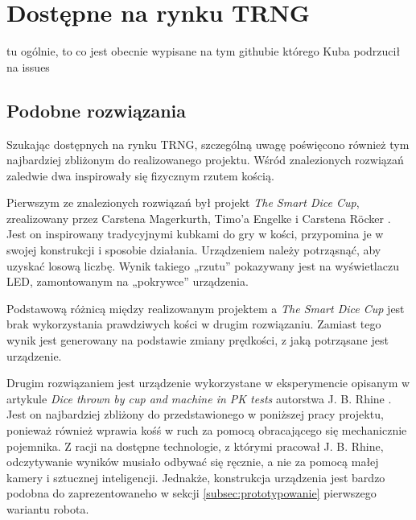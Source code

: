 \section{Dostępne na rynku TRNG}\label{sec:dostepne-na-rynku-trng}

tu ogólnie, to co jest obecnie wypisane na tym githubie którego Kuba podrzucił na issues

\subsection{Podobne rozwiązania}

Szukając dostępnych na rynku TRNG, szczególną uwagę poświęcono również tym najbardziej zbliżonym do realizowanego projektu.
Wśród znalezionych rozwiązań zaledwie dwa inspirowały się fizycznym rzutem kością. 

Pierwszym ze znalezionych rozwiązań był projekt \textit{The Smart Dice Cup}, zrealizowany przez Carstena Magerkurth, 
Timo'a Engelke i Carstena Röcker \cite{SmartDice}. Jest on inspirowany tradycyjnymi kubkami do gry w kości, przypomina
je w swojej konstrukcji i sposobie działania. Urządzeniem należy potrząsnąć, aby uzyskać losową 
liczbę. Wynik takiego „rzutu” pokazywany jest na wyświetlaczu LED, zamontowanym na „pokrywce” urządzenia.

Podstawową różnicą między realizowanym projektem a \textit{The Smart Dice Cup} jest brak wykorzystania prawdziwych 
kości w drugim rozwiązaniu. Zamiast tego wynik jest generowany na podstawie zmiany prędkości, z jaką potrząsane jest 
urządzenie.

Drugim rozwiązaniem jest urządzenie wykorzystane w eksperymencie opisanym w artykule \textit{Dice thrown by cup and machine in PK tests} autorstwa J. B. Rhine \cite{betoniarka43}. 
Jest on najbardziej zbliżony do przedstawionego w poniższej pracy projektu, ponieważ również wprawia kośś w 
ruch za pomocą obracającego się mechanicznie pojemnika. Z racji na dostępne technologie, z którymi pracował J. B. Rhine,
odczytywanie wyników musiało odbywać się ręcznie, a nie za pomocą małej kamery i sztucznej inteligencji. Jednakże,
konstrukcja urządzenia jest bardzo podobna do zaprezentowaneho w sekcji \ref{subsec:prototypowanie} pierwszego wariantu robota.